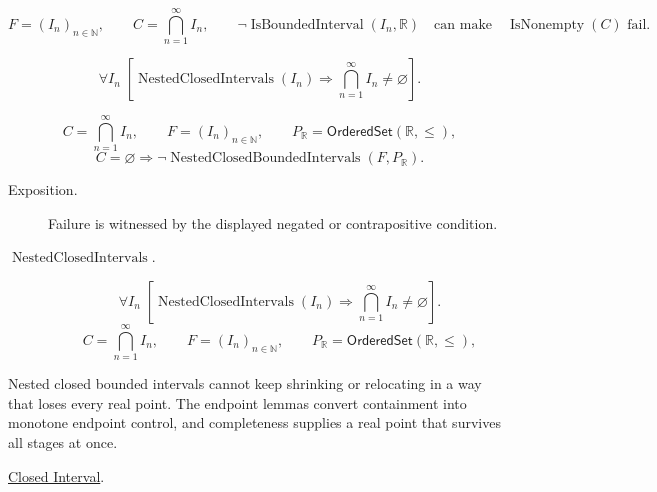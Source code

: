 \begin{remark*}
\[
F=(I_n)_{n\in\mathbb{N}},\qquad C=\bigcap_{n=1}^{\infty}I_n,\qquad
\neg\operatorname{IsBoundedInterval}(I_n,\mathbb{R})
\quad\text{can make}\quad
\operatorname{IsNonempty}(C)
\text{ fail.}
\]
\end{remark*}

\begin{remark*}
\[
\forall I_n\;
\left[
\operatorname{NestedClosedIntervals}(I_n)
\Longrightarrow
\bigcap_{n=1}^{\infty}I_n\ne\varnothing
\right].
\]
\end{remark*}

\begin{remark*}
\[
C=\bigcap_{n=1}^{\infty}I_n,\qquad F=(I_n)_{n\in\mathbb{N}},\qquad
P_{\mathbb{R}}=\mathsf{OrderedSet}(\mathbb{R},\leq),
\]
\[
C=\varnothing
\Longrightarrow
\neg\operatorname{NestedClosedBoundedIntervals}(F,P_{\mathbb{R}}).
\]
\end{remark*}

\begin{remark*}
\begin{description}
  \item[Exposition.]
  Failure is witnessed by the displayed negated or contrapositive condition.

  \item[\(\operatorname{NestedClosedIntervals}.\)]
  \[
\forall I_n\;
\left[
\operatorname{NestedClosedIntervals}(I_n)
\Longrightarrow
\bigcap_{n=1}^{\infty}I_n\ne\varnothing
\right].
\]
\[
C=\bigcap_{n=1}^{\infty}I_n,\qquad F=(I_n)_{n\in\mathbb{N}},\qquad
P_{\mathbb{R}}=\mathsf{OrderedSet}(\mathbb{R},\leq),
\]
\end{description}
\end{remark*}

\begin{remark*}[Interpretation]
Nested closed bounded intervals cannot keep shrinking or relocating in a way
that loses every real point. The endpoint lemmas convert containment into
monotone endpoint control, and completeness supplies a real point that survives
all stages at once.
\end{remark*}

\begin{dependencies}
\hyperref[def:closed-interval]{Closed Interval}.
\end{dependencies}


